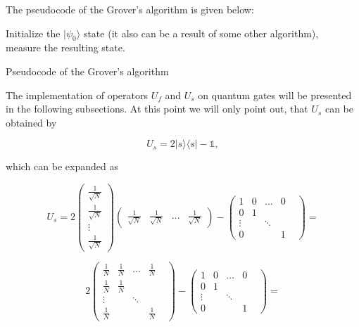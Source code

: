 The pseudocode of the Grover's algorithm is given below:

\begin{algorithm}[H]
        Initialize the $|\psi_0\rangle$ state (it also can be a result of some other algorithm),\\
        measure the resulting state.
 \caption{Pseudocode of the Grover's algorithm}
\end{algorithm}

The implementation of operators $U_f$ and $U_s$ on quantum gates will be presented in the following subsections. At this point we will only point out, that $U_s$ can be obtained by

\[ U_s = 2|s\rangle \langle s| - \mathbb{1},\]

which can be expanded as

\[ U_s = 2 \begin{pmatrix} \frac{1}{\sqrt{N}} \\ \frac{1}{\sqrt{N}} \\ \vdots \\ \frac{1}{\sqrt{N}} \end{pmatrix} \begin{pmatrix} \frac{1}{\sqrt{N}} & \frac{1}{\sqrt{N}} & \hdots & \frac{1}{\sqrt{N}} \end{pmatrix} - \begin{pmatrix} 1 & 0 & \hdots & 0 \\ 0 & 1 & & & \\ \vdots & & \ddots & \\ 0 & & & 1 \end{pmatrix} = \]

\[ 2 \begin{pmatrix} \frac{1}{N} & \frac{1}{N} & \hdots & \frac{1}{N} \\ \frac{1}{N} & \frac{1}{N} & & & \\ \vdots & & \ddots & \\ \frac{1}{N} & & & \frac{1}{N} \end{pmatrix} - \begin{pmatrix} 1 & 0 & \hdots & 0 \\ 0 & 1 & & & \\ \vdots & & \ddots & \\ 0 & & & 1 \end{pmatrix} = \]

